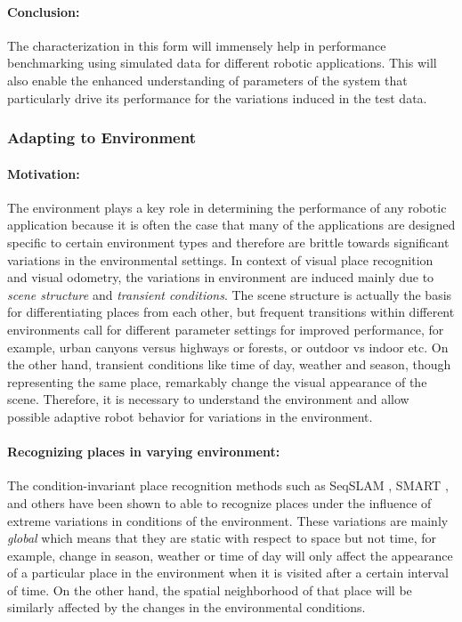 \documentclass{article}
\begin{document}
\paragraph{Conclusion:}The characterization in this form will immensely help in performance benchmarking using simulated data for different robotic applications. This will also enable the enhanced understanding of parameters of the system that particularly drive its performance for the variations induced in the test data.

\subsubsection{Adapting to Environment}
\paragraph{Motivation:}The environment plays a key role in determining the performance of any robotic application because it is often the case that many of the applications are designed specific to certain environment types and therefore are brittle towards significant variations in the environmental settings. In context of visual place recognition and visual odometry, the variations in environment are induced mainly due to \emph{scene structure} and \emph{transient conditions}. The scene structure is actually the basis for differentiating places from each other, but frequent transitions within different environments call for different parameter settings for improved performance, for example, urban canyons versus highways or forests, or outdoor vs indoor etc. On the other hand, transient conditions like time of day, weather and season, though representing the same place, remarkably change the visual appearance of the scene. Therefore, it is necessary to understand the environment and allow possible adaptive robot behavior for variations in the environment.

\paragraph{Recognizing places in varying environment:}The condition-invariant place recognition methods such as SeqSLAM \cite{Milford2012}, SMART \cite{Pepperell2014}, and others \cite{Naseer2014,Niko2015,Maddern} have been shown to able to recognize places under the influence of extreme variations in conditions of the environment. These variations are mainly \emph{global} which means that they are static with respect to space but not time, for example, change in season, weather or time of day will only affect the appearance of a particular place in the environment when it is visited after a certain interval of time. On the other hand, the spatial neighborhood of that place will be similarly affected by the changes in the environmental conditions. 
\end{document}
